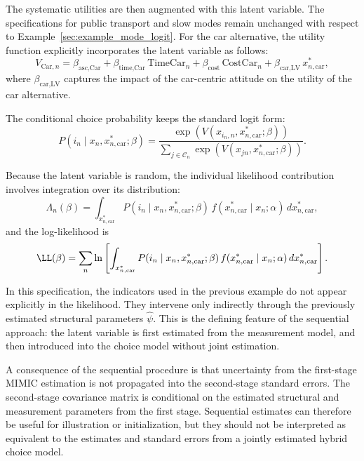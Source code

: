 \documentclass[12pt,a4paper]{article}
\newcommand{\TimeCar}{\mathrm{TimeCar}}
\newcommand{\CostCar}{\mathrm{CostCar}}
\begin{document}
The systematic utilities are then augmented with this latent variable.
The specifications for public transport and slow modes remain
unchanged with respect to Example~\ref{sec:example_mode_logit}. For
the car alternative, the utility function explicitly incorporates the
latent variable as follows:
\begin{equation}
  \label{eq:example3_v_car}
  V_{\text{Car},n} = \beta_{\text{asc,Car}} + \beta_{\text{time,Car}}
  \, \TimeCar_n + \beta_{\text{cost}} \, \CostCar_n +
  \beta_{\text{car,LV}} \, x^*_{n,\text{car}},
\end{equation}
where \(\beta_{\text{car,LV}}\) captures the impact of the car-centric
attitude on the utility of the car alternative.

The conditional choice probability keeps the standard logit form:
\begin{equation}
  \label{eq:example3_logit}
  P(i_n \mid x_n, x^*_{n,\text{car}};\beta) = \frac{\exp\!\left(V(x_{i_n,n},x^*_{n,\text{car}};\beta)\right)} {\sum_{j \in \mathcal
      C_n} \exp\!\left(V(x_{jn},x^*_{n,\text{car}};\beta)\right)}.
\end{equation}

Because the latent variable is random, the individual likelihood
contribution involves integration over its distribution:
\begin{equation}
  \label{eq:example3_likelihood}
  \Lambda_n(\beta) = \int_{x^*_{n,\text{car}}} P(i_n \mid x_n,
  x^*_{n,\text{car}};\beta)\, f(x^*_{n,\text{car}}\mid x_n;\alpha)\,
  dx^*_{n,\text{car}},
\end{equation}
and the log-likelihood is
\begin{equation}
  \label{eq:example3_loglikelihood}
  \LL(\beta) = \sum_n \ln \left[ \int_{x^*_{n,\text{car}}} P(i_n \mid
    x_n, x^*_{n,\text{car}};\beta)\, f(x^*_{n,\text{car}}\mid x_n;\alpha)\,
    dx^*_{n,\text{car}} \right].
\end{equation}

In this specification, the indicators used in the previous example do
not appear explicitly in the likelihood. They intervene only
indirectly through the previously estimated structural parameters
\(\hat{\psi}\). This is the defining feature of the sequential
approach: the latent variable is first estimated from the measurement
model, and then introduced into the choice model without joint
estimation.

A consequence of the sequential procedure is that uncertainty from the
first-stage MIMIC estimation is not propagated into the second-stage
standard errors. The second-stage covariance matrix is conditional on
the estimated structural and measurement parameters from the first
stage. Sequential estimates can therefore be useful for illustration
or initialization, but they should not be interpreted as equivalent to
the estimates and standard errors from a jointly estimated hybrid
choice model.
\end{document}
